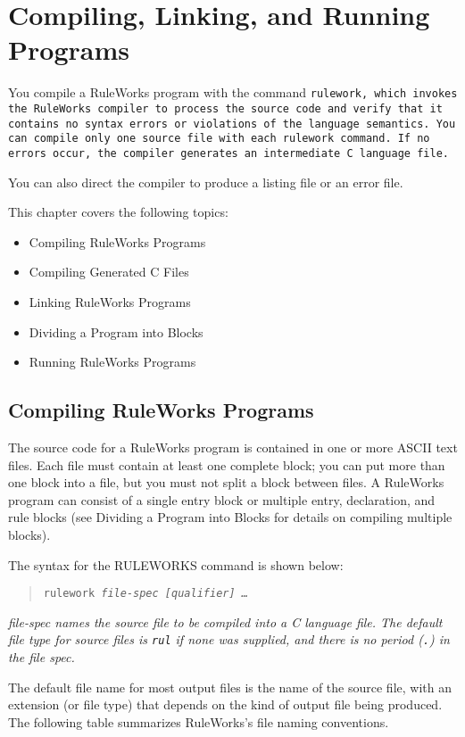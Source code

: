 \chapter{Compiling, Linking, and Running Programs}

You compile a RuleWorks program with the command
\tt{rulework}, which invokes the RuleWorks compiler to
process the source code and verify that it contains no
syntax errors or violations of the language semantics.
You can compile only one source file with each \tt{rulework}
command. If no errors occur, the compiler generates an
intermediate C language file.

You can also direct the compiler to produce a listing
file or an error file.

This chapter covers the following topics:
\begin{itemize}
\item Compiling RuleWorks Programs
\item Compiling Generated C Files
\item Linking RuleWorks Programs
\item Dividing a Program into Blocks
\item Running RuleWorks Programs
\end{itemize}

\section{Compiling RuleWorks Programs}

The source code for a RuleWorks program is contained in
one or more ASCII text files. Each file must contain at
least one complete block; you can put more than one block
into a file, but you must not split a block between
files. A RuleWorks program can consist of a single entry
block or multiple entry, declaration, and rule blocks
(see Dividing a Program into Blocks for details on
compiling multiple blocks).

The syntax for the RULEWORKS command is shown below:
\begin{quote}
\tt{rulework} \it{file-spec} [\it{qualifier}] \ldots
\end{quote}
\it{file-spec} names the source file to be compiled into a C
language file. The default file type for source files is
\verb|rul| if none was supplied, and there is no period (\verb|.|) in
the file spec.

The default file name for most output files is the name of the source
file, with an extension (or file type) that depends on the kind of
output file being produced. The following table summarizes RuleWorks's
file naming conventions.

